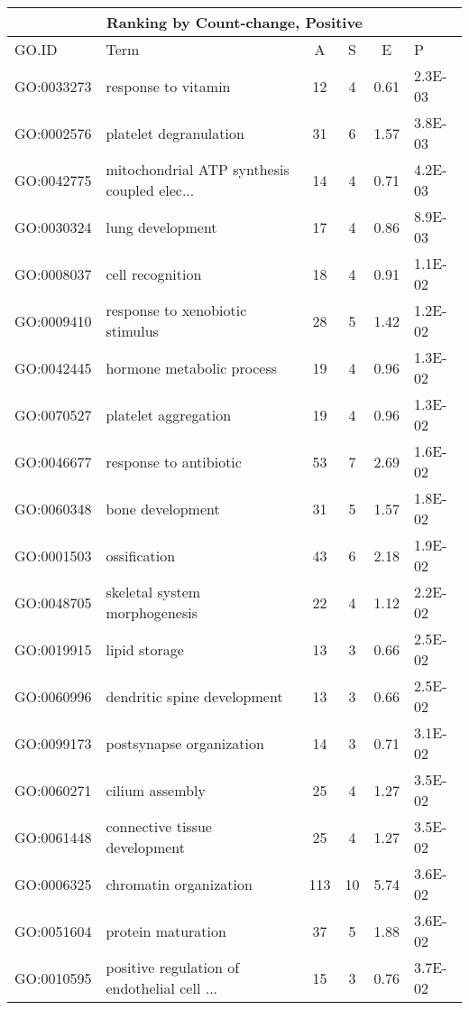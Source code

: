 \begin{table}[ht]
\centering
\begin{tabular}{llcccl}
\multicolumn{6}{c}{\bf Ranking by Count-change, Positive} \\
  \hline
GO.ID & Term & A & S & E & P \\ 
  \hline
GO:0033273 & response to vitamin &  12 &   4 & 0.61 & 2.3E-03 \\ 
  GO:0002576 & platelet degranulation &  31 &   6 & 1.57 & 3.8E-03 \\ 
  GO:0042775 & mitochondrial ATP synthesis coupled elec... &  14 &   4 & 0.71 & 4.2E-03 \\ 
  GO:0030324 & lung development &  17 &   4 & 0.86 & 8.9E-03 \\ 
  GO:0008037 & cell recognition &  18 &   4 & 0.91 & 1.1E-02 \\ 
  GO:0009410 & response to xenobiotic stimulus &  28 &   5 & 1.42 & 1.2E-02 \\ 
  GO:0042445 & hormone metabolic process &  19 &   4 & 0.96 & 1.3E-02 \\ 
  GO:0070527 & platelet aggregation &  19 &   4 & 0.96 & 1.3E-02 \\ 
  GO:0046677 & response to antibiotic &  53 &   7 & 2.69 & 1.6E-02 \\ 
  GO:0060348 & bone development &  31 &   5 & 1.57 & 1.8E-02 \\ 
  GO:0001503 & ossification &  43 &   6 & 2.18 & 1.9E-02 \\ 
  GO:0048705 & skeletal system morphogenesis &  22 &   4 & 1.12 & 2.2E-02 \\ 
  GO:0019915 & lipid storage &  13 &   3 & 0.66 & 2.5E-02 \\ 
  GO:0060996 & dendritic spine development &  13 &   3 & 0.66 & 2.5E-02 \\ 
  GO:0099173 & postsynapse organization &  14 &   3 & 0.71 & 3.1E-02 \\ 
  GO:0060271 & cilium assembly &  25 &   4 & 1.27 & 3.5E-02 \\ 
  GO:0061448 & connective tissue development &  25 &   4 & 1.27 & 3.5E-02 \\ 
  GO:0006325 & chromatin organization & 113 &  10 & 5.74 & 3.6E-02 \\ 
  GO:0051604 & protein maturation &  37 &   5 & 1.88 & 3.6E-02 \\ 
  GO:0010595 & positive regulation of endothelial cell ... &  15 &   3 & 0.76 & 3.7E-02 \\ 

\end{tabular}
\end{table}
